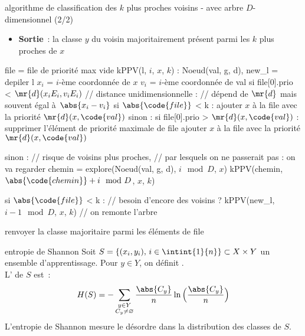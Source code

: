 \begin{adjustwidth}{-3cm}{-3cm}
\begin{implementation}{algorithme de classification des $k$ plus proches voisins - avec arbre $D$-dimensionnel (2/2)}
\begin{itemize}
\begin{itemize}
        \end{itemize}
        \item \textbf{Sortie}~: la classe $y$ du voisin majoritairement présent parmi les $k$ plus proches de $x$
    \end{itemize}
    \begin{lstLNat}
    file = file de priorité max vide
    kPPV(l, $i$, $x$, $k$) :
        Noeud(val, g, d), new_l = depiler l
        $x_{i}$ = $i$-ème coordonnée de $x$
        $v_{i}$ = $i$-ème coordonnée de val
        si file[0].prio < $\mr{d}(x_{i}E_{i},v_{i}E_{i})$ // distance unidimensionnelle : 
                // dépend de $\mr{d}$ mais souvent égal à $\,\abs{x_{i} - v_{i}}$
            si $\abs{\code{file}}$ < k :
                ajouter $x$ à la file avec la priorité $\mr{d}(x,\code{val})$
            sinon :
                si file[0].prio > $\mr{d}(x,\code{val})$ :
                    supprimer l'élément de priorité maximale de file
                    ajouter $x$ à la file avec la priorité $\mr{d}(x,\code{val})$

        sinon : // risque de voisins plus proches, 
                // par lesquels on ne passerait pas : on va regarder
            chemin = explore(Noeud(val, g, d), $i \mod D$, $x$)
            kPPV(chemin, $\abs{\code{chemin}} + i \mod D$, $x$, $k$)
         
        si $\abs{\code{file}}$ < k : // besoin d'encore des voisins ?
            kPPV(new_l, $i-1 \mod D$, $x$, $k$) // on remonte l'arbre

        renvoyer la classe majoritaire parmi les éléments de file
    \end{lstLNat}
\end{implementation}

\begin{definition}{5.6}{entropie de Shannon}
    Soit $S = \{(x_i,y_i),\, i \in \intint{1}{n}\} \subset X \times Y$ un ensemble d'apprentissage. Pour $y \in Y$, on définit .\\
    L' de $S$ est~:
    $$H(S) = - \sum_{\substack{y \in Y\\C_y \neq \varnothing}}\frac{\abs{C_y}}{n} \ln\Big(\frac{\abs{C_y}}{n}\Big)$$
    L'entropie de Shannon mesure le désordre dans la distribution des classes de $S$.
\end{definition}


\end{adjustwidth}
